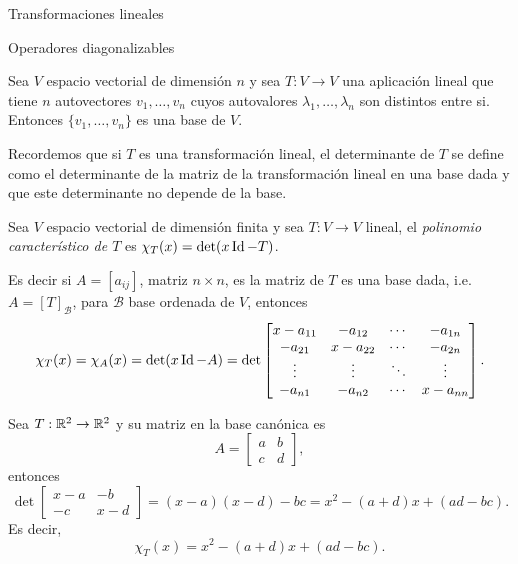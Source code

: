 \begin{chapter}{Transformaciones lineales}
\begin{section}{Operadores diagonalizables}
        \begin{corolario}\label{cor-aut-li}
            Sea $V$ espacio vectorial de dimensión $n$ y sea $T: V \to V$ una aplicación lineal que tiene $n$
            autovectores $v_1,\ldots, v_n$ cuyos autovalores $\lambda_1,\ldots,\lambda_n$ son distintos entre
            si. Entonces $\{v_1,\ldots, v_n\}$ es una base de $V$.
        \end{corolario}
        
        Recordemos que si $T$  es una transformación lineal, el determinante de $T$  se define como el determinante de la matriz de la transformación lineal en una base dada y que este determinante no depende de la base.    
        
        \begin{definicion}            
            Sea $V$ espacio vectorial de dimensión finita y sea $T: V \to V$ lineal, el  \textit{polinomio característico de $T$} es $\chi_T(x) = \det(x \operatorname{Id}-T)$.
        \end{definicion}

        Es decir si $A = [a_{ij}]$, matriz $n \times n$, es la matriz de $T$ es una base dada, i.e. $A = [T]_{\mathcal B}$, para $\mathcal B$  base ordenada de $V$, entonces
        \begin{equation*}
        \chi_T(x) = \chi_A(x) = \det(x\operatorname{Id} -A) = \det
        \begin{bmatrix}
        x-a_{11}&-a_{12}&\cdots&-a_{1n}\\
        -a_{21}&x-a_{22}&\cdots&-a_{2n}\\
        \vdots&\vdots&\ddots&\vdots\\
        -a_{n1}&-a_{n2}&\cdots&x-a_{nn}
        \end{bmatrix}.
        \end{equation*} 
    
        
        \begin{ejemplo*}
            Sea $T: \mathbb R^2 \to \mathbb R^2$ y su matriz en la base canónica es
            \begin{equation*}
                A = \begin{bmatrix}
                    a&b\\c&d
                \end{bmatrix},
            \end{equation*}
        entonces
        \begin{equation*}
            \det \begin{bmatrix}
                x-a & -b \\ -c &x-d
                \end{bmatrix} = 
                (x-a)(x-d) - bc = x^2 -(a+d)x + (ad -bc).
        \end{equation*}
        Es decir,
        $$
        \chi_T(x) = x^2 -(a+d)x + (ad -bc).
        $$ 
        \end{ejemplo*}


\end{section}
\end{chapter}
